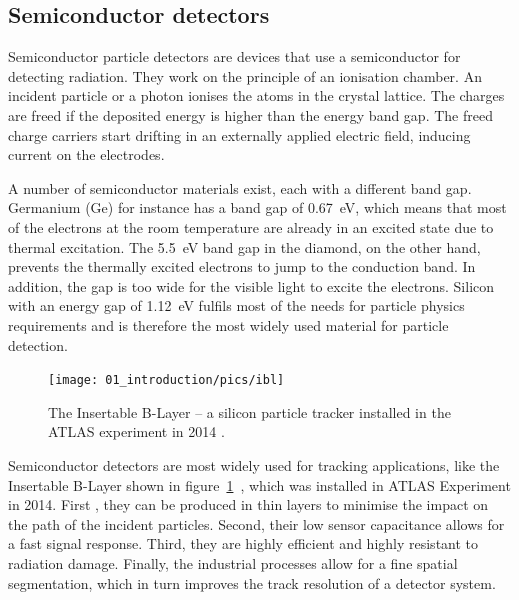 

\subsection{Semiconductor detectors}
Semiconductor particle detectors are devices that use a semiconductor for detecting radiation. They work on the principle of an ionisation chamber. An incident particle or a photon ionises the atoms in the crystal lattice. The charges are freed if the deposited energy is higher than the energy band gap. The freed charge carriers start drifting in an externally applied electric field, inducing current on the electrodes. 

A number of semiconductor materials exist, each with a different band gap. Germanium (Ge) for instance has a band gap of 0.67~eV, which means that most of the electrons at the room temperature are already in an excited state due to thermal excitation. The 5.5~eV band gap in the diamond, on the other hand, prevents the thermally excited electrons to jump to the conduction band. In addition, the gap is too wide for the visible light to excite the electrons. Silicon with an energy gap of 1.12~eV fulfils most of the needs for particle physics requirements and is therefore the most widely used material for particle detection. 
\begin{figure}[!t]
\centering
\texttt{[image: 01\_introduction/pics/ibl]}
\caption{The Insertable B-Layer -- a silicon particle tracker installed in the ATLAS experiment in 2014 \cite{MarcelloniDeOliveira:1702006}.}
\label{fig:ibl}
\end{figure}

Semiconductor detectors are most widely used for tracking applications, like the Insertable B-Layer shown in figure~\ref{fig:ibl}~\cite{Pernegger:1985432}, which was installed in ATLAS Experiment in 2014. First , they can be produced in thin layers to minimise the impact on the path of the incident particles. Second, their low sensor capacitance allows for a fast signal response. Third, they are highly efficient and highly resistant to radiation damage. Finally, the industrial processes allow for a fine spatial segmentation, which in turn improves the track resolution of a detector system. 

